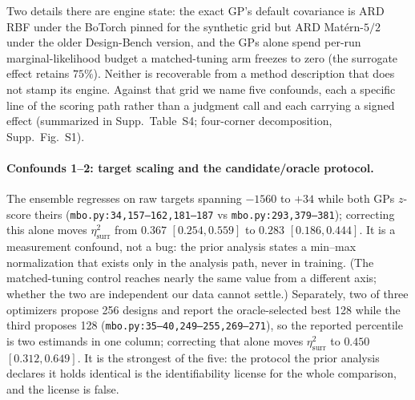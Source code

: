 \documentclass[letterpaper]{article} %
\theoremstyle{plain}
\begin{document}
Two details there are engine state: the exact GP's default covariance is ARD RBF under the BoTorch pinned for the synthetic grid but ARD Mat\'ern-$5/2$ under the older Design-Bench version, and the GPs alone spend per-run marginal-likelihood budget a matched-tuning arm freezes to zero (the surrogate effect retains $75\%$). Neither is recoverable from a method description that does not stamp its engine. Against that grid we name five confounds, each a specific line of the scoring path rather than a judgment call and each carrying a signed effect (summarized in Supp.\ Table~S4; four-corner decomposition, Supp.\ Fig.\ S1).

\paragraph{Confounds 1--2: target scaling and the candidate/oracle protocol.} The ensemble regresses on raw targets spanning $-1560$ to $+34$ while both GPs $z$-score theirs (\texttt{mbo.py:34,157--162,181--187} vs \texttt{mbo.py:293,379--381}); correcting this alone moves $\eta^2_{\text{surr}}$ from $0.367$ $[0.254,0.559]$ to $0.283$ $[0.186,0.444]$. It is a measurement confound, not a bug: the prior analysis states a min--max normalization that exists only in the analysis path, never in training. (The matched-tuning control reaches nearly the same value from a different axis; whether the two are independent our data cannot settle.) Separately, two of three optimizers propose 256 designs and report the oracle-selected best 128 while the third proposes 128 (\texttt{mbo.py:35--40,249--255,269--271}), so the reported percentile is two estimands in one column; correcting that alone moves $\eta^2_{\text{surr}}$ to $0.450$ $[0.312,0.649]$. It is the strongest of the five: the protocol the prior analysis declares it holds identical is the identifiability license for the whole comparison, and the license is false.
\end{document}
